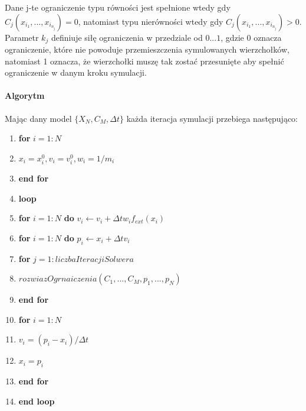\raggedright
Dane j-te ograniczenie typu równości jest spełnione wtedy gdy $C_j(x_{i_1},...,
		x_{i_{n_j}}) = 0$, natomiast typu nierówności wtedy gdy $C_j(x_{i_1},...,
		x_{i_{n_j}}) > 0$. Parametr $k_j$ definiuje siłę ograniczenia w
		przedziale od $0...1$, gdzie 0 oznacza ograniczenie, które nie powoduje
		przemieszczenia symulowanych wierzchołków, natomiast 1 oznacza, że
		wierzchołki muszę tak zostać przesunięte aby spełnić ograniczenie w
		danym kroku symulacji.

\paragraph{Algorytm}

Mając dany model $\{X_N, C_M, \Delta t \} $ każda iteracja symulacji przebiega
następująco:
\begin{enumerate}
\item \textbf{for} $i = 1:N$
\item \hspace{1cm} $x_i = x_i^0, v_i = v_i^0, w_i = 1/m_i$
\item \textbf{end for}
\item \textbf{loop}
\item \hspace{1cm} \textbf{for} $i = 1:N$ \textbf{do} $v_i \leftarrow v_i + \Delta t w_i f_{ext}(x_i)$
\item \hspace{1cm} \textbf{for} $i = 1:N$ \textbf{do} $p_i \leftarrow x_i + \Delta t v_i$
\item \hspace{1cm} \textbf{for} $j = 1:liczbaIteracjiSolwera$
\item \hspace{2cm} $rozwiazOgrnaiczenia(C_1,..., C_{M}, p_1, ..., p_N)$
\item \hspace{1cm} \textbf{end for}
\item \hspace{1cm} \textbf{for} $i = 1:N$
\item \hspace{2cm} $v_i = (p_i - x_i) / \Delta t$
\item \hspace{2cm} $x_i = p_i$
\item \hspace{1cm}\textbf{end for}
\item \textbf{end loop}

\end{enumerate}

